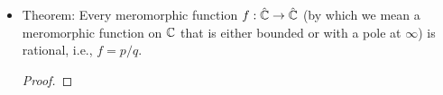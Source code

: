 \documentclass[../notes.tex]{subfiles}
\begin{document}
\begin{itemize}
\begin{equation*}
        \res_p(f) = 0
    \end{equation*}
    \begin{proof}
        This goes back to the proposition from the 3/28 class. If the residue is zero, then the closed loop integral is zero, so by homotopy, $f$ has a primitive on the disk?? And if it has a primitive, then it's holomorphic on $D$ and therefore the residue is zero.
    \end{proof}
    \item Theorem: Every meromorphic function $f:\hat{\mathbb{C}}\to\hat{\mathbb{C}}$ (by which we mean a meromorphic function on $\mathbb{C}$ that is either bounded or with a pole at $\infty$) is rational, i.e., $f=p/q$.
    \begin{proof}
            
            



\end{proof}
\end{itemize}
\end{document}
